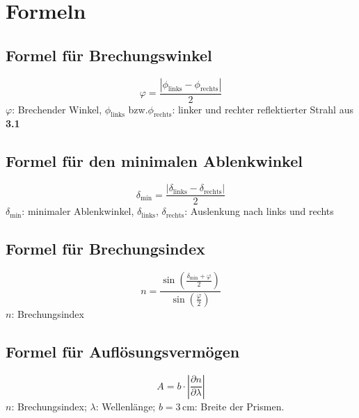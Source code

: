 \documentclass[fontsize=12pt]{scrartcl}
\renewcommand{\l}{\left\vert}
\renewcommand{\r}{\right\vert}
\begin{document}
\section{Formeln}

\subsection{Formel für Brechungswinkel}
\begin{equation}
\label{phi}
\varphi=\frac{\l \phi_{\text{links}} - \phi_{\text{rechts}}\r}{2}
\end{equation}
$\varphi$: Brechender Winkel, $\phi_{\text{links}}$ bzw.$ \phi_{\text{rechts}}$: linker und rechter reflektierter Strahl aus \textbf{3.1}

\subsection{Formel für den minimalen Ablenkwinkel}
\begin{equation}
\label{delta}
\delta_{\text{min}}=\frac{\l\delta_{\text{links}} - \delta_{\text{rechts}}\r}{2}
\end{equation}
$\delta_{\text{min}}$: minimaler Ablenkwinkel, $\delta_{\text{links}}$, $\delta_{\text{rechts}}$: Auslenkung nach links und rechts

\subsection{Formel für Brechungsindex}
\begin{equation}
\label{n}
n=\frac{\sin(\frac{\delta_{\text{min}}+\varphi}{2})}{\sin(\frac{\varphi}{2})}
\end{equation}
$n$: Brechungsindex

\subsection{Formel für Auflösungsvermögen}
\begin{equation}
\label{n}
A=b\cdot\l \frac{\partial n}{\partial \lambda} \r
\end{equation}
$n$: Brechungsindex; $\lambda$: Wellenlänge; $b=3$\,cm: Breite der Prismen.

\newpage
\end{document}
